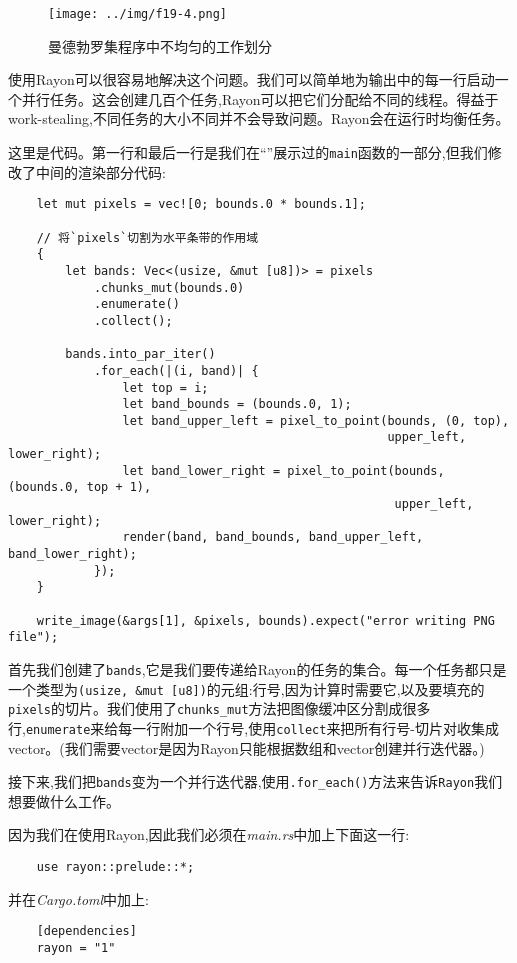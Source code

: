 \begin{figure}[htbp]
    \centering
    \texttt{[image: ../img/f19-4.png]}
    \caption{曼德勃罗集程序中不均匀的工作划分}
    \label{f19-4}
\end{figure}

使用Rayon可以很容易地解决这个问题。我们可以简单地为输出中的每一行启动一个并行任务。这会创建几百个任务,Rayon可以把它们分配给不同的线程。得益于work-stealing,不同任务的大小不同并不会导致问题。Rayon会在运行时均衡任务。

这里是代码。第一行和最后一行是我们在“”展示过的\texttt{main}函数的一部分,但我们修改了中间的渲染部分代码:
\begin{verbatim}
    let mut pixels = vec![0; bounds.0 * bounds.1];

    // 将`pixels`切割为水平条带的作用域
    {
        let bands: Vec<(usize, &mut [u8])> = pixels
            .chunks_mut(bounds.0)
            .enumerate()
            .collect();
        
        bands.into_par_iter()
            .for_each(|(i, band)| {
                let top = i;
                let band_bounds = (bounds.0, 1);
                let band_upper_left = pixel_to_point(bounds, (0, top),
                                                     upper_left, lower_right);
                let band_lower_right = pixel_to_point(bounds, (bounds.0, top + 1),
                                                      upper_left, lower_right);
                render(band, band_bounds, band_upper_left, band_lower_right);
            });
    }

    write_image(&args[1], &pixels, bounds).expect("error writing PNG file");
\end{verbatim}

首先我们创建了\texttt{bands},它是我们要传递给Rayon的任务的集合。每一个任务都只是一个类型为\texttt{(usize, \&mut [u8])}的元组:行号,因为计算时需要它,以及要填充的\texttt{pixels}的切片。我们使用了\texttt{chunks\_mut}方法把图像缓冲区分割成很多行,\texttt{enumerate}来给每一行附加一个行号,使用\texttt{collect}来把所有行号-切片对收集成vector。(我们需要vector是因为Rayon只能根据数组和vector创建并行迭代器。)

接下来,我们把\texttt{bands}变为一个并行迭代器,使用\texttt{.for\_each()}方法来告诉\texttt{Rayon}我们想要做什么工作。

因为我们在使用Rayon,因此我们必须在\emph{main.rs}中加上下面这一行:
\begin{verbatim}
    use rayon::prelude::*;
\end{verbatim}
并在\emph{Cargo.toml}中加上:
\begin{verbatim}
    [dependencies]
    rayon = "1"
\end{verbatim}

